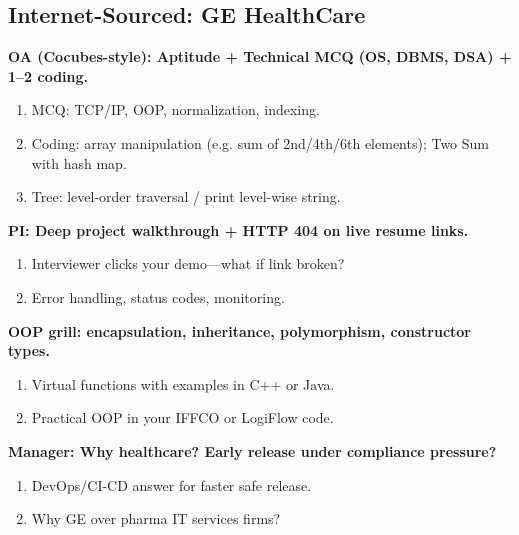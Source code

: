 \documentclass[9pt,a4paper]{article}
\begin{document}
\subsection{Internet-Sourced: GE HealthCare}
\textbf{OA (Cocubes-style): Aptitude + Technical MCQ (OS, DBMS, DSA) + 1--2 coding.}
\begin{enumerate}[label=\textit{Probe \arabic*:}]
  \item MCQ: TCP/IP, OOP, normalization, indexing.
  \item Coding: array manipulation (e.g. sum of 2nd/4th/6th elements); Two Sum with hash map.
  \item Tree: level-order traversal / print level-wise string.
\end{enumerate}
\vspace{2mm}
\textbf{PI: Deep project walkthrough + HTTP 404 on live resume links.}
\begin{enumerate}[label=\textit{Probe \arabic*:}]
  \item Interviewer clicks your demo---what if link broken?
  \item Error handling, status codes, monitoring.
\end{enumerate}
\vspace{2mm}
\textbf{OOP grill: encapsulation, inheritance, polymorphism, constructor types.}
\begin{enumerate}[label=\textit{Probe \arabic*:}]
  \item Virtual functions with examples in C++ or Java.
  \item Practical OOP in your IFFCO or LogiFlow code.
\end{enumerate}
\vspace{2mm}
\textbf{Manager: Why healthcare? Early release under compliance pressure?}
\begin{enumerate}[label=\textit{Probe \arabic*:}]
  \item DevOps/CI-CD answer for faster safe release.
  \item Why GE over pharma IT services firms?
\end{enumerate}
\vspace{2mm}
\end{document}
